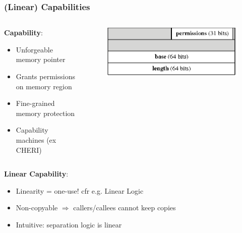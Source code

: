 \documentclass{beamer}
\begin{document}
\begin{frame}
\frametitle{(Linear) Capabilities}

\begin{columns}
\begin{column}{0.5\textwidth}
	\textbf{Capability}: %
\begin{itemize}
\item Unforgeable memory pointer
\item Grants permissions on memory region
\item Fine-grained memory protection
\item Capability machines (ex CHERI)
\end{itemize}
\end{column}
\begin{column}{0.5\textwidth}
\begin{figure}
\includegraphics[width=\linewidth]{Capability}%
\end{figure}
\end{column}
\end{columns}
\vspace{.5em}


\textbf{Linear Capability}: %
\begin{itemize}
\item Linearity = one-use! cfr e.g. Linear Logic
\item Non-copyable
$\Rightarrow$ callers/callees cannot keep copies
\item Intuitive: separation logic is linear
\end{itemize}
\end{frame}
\end{document}
